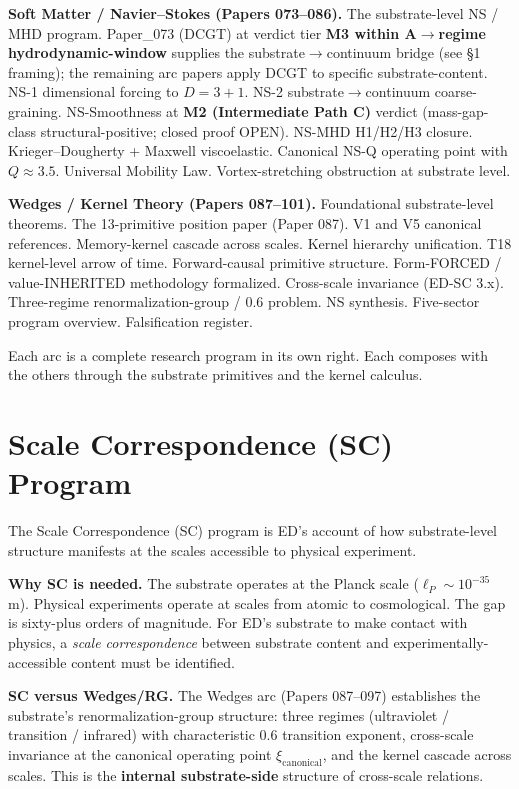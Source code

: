 \documentclass[11pt,a4paper]{article}
\begin{document}
\textbf{Soft Matter / Navier--Stokes (Papers 073--086).} The substrate-level NS / MHD program. Paper\_073 (DCGT) at verdict tier \textbf{M3 within A$\to$regime hydrodynamic-window} supplies the substrate$\to$continuum bridge (see \S1 framing); the remaining arc papers apply DCGT to specific substrate-content. NS-1 dimensional forcing to $D = 3+1$. NS-2 substrate$\to$continuum coarse-graining. NS-Smoothness at \textbf{M2 (Intermediate Path C)} verdict (mass-gap-class structural-positive; closed proof OPEN). NS-MHD H1/H2/H3 closure. Krieger--Dougherty + Maxwell viscoelastic. Canonical NS-Q operating point with $Q \approx 3.5$. Universal Mobility Law. Vortex-stretching obstruction at substrate level.

\textbf{Wedges / Kernel Theory (Papers 087--101).} Foundational substrate-level theorems. The 13-primitive position paper (Paper 087). V1 and V5 canonical references. Memory-kernel cascade across scales. Kernel hierarchy unification. T18 kernel-level arrow of time. Forward-causal primitive structure. Form-FORCED / value-INHERITED methodology formalized. Cross-scale invariance (ED-SC 3.x). Three-regime renormalization-group / 0.6 problem. NS synthesis. Five-sector program overview. Falsification register.

Each arc is a complete research program in its own right. Each composes with the others through the substrate primitives and the kernel calculus.

\section{Scale Correspondence (SC) Program}

The Scale Correspondence (SC) program is ED's account of how substrate-level structure manifests at the scales accessible to physical experiment.

\textbf{Why SC is needed.} The substrate operates at the Planck scale ($\ell_P \sim 10^{-35}$ m). Physical experiments operate at scales from atomic to cosmological. The gap is sixty-plus orders of magnitude. For ED's substrate to make contact with physics, a \emph{scale correspondence} between substrate content and experimentally-accessible content must be identified.

\textbf{SC versus Wedges/RG.} The Wedges arc (Papers 087--097) establishes the substrate's renormalization-group structure: three regimes (ultraviolet / transition / infrared) with characteristic 0.6 transition exponent, cross-scale invariance at the canonical operating point $\xi_\mathrm{canonical}$, and the kernel cascade across scales. This is the \textbf{internal substrate-side} structure of cross-scale relations.
\end{document}
